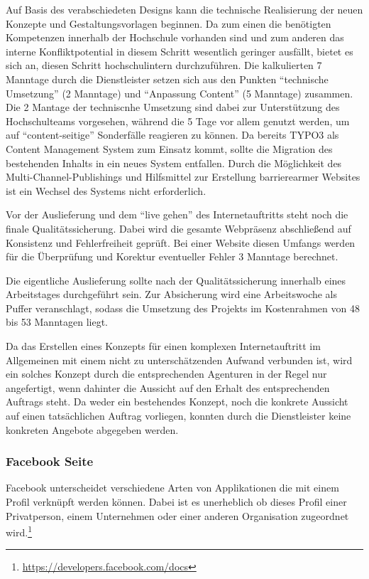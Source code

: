 Auf Basis des verabschiedeten Designs kann die technische Realisierung der neuen Konzepte und Gestaltungsvorlagen beginnen. Da zum einen die benötigten Kompetenzen innerhalb der Hochschule vorhanden sind und zum anderen das interne Konfliktpotential in diesem Schritt wesentlich geringer ausfällt, bietet es sich an, diesen Schritt hochschulintern durchzuführen. Die kalkulierten 7 Manntage durch die Dienstleister setzen sich aus den Punkten “technische Umsetzung” (2 Manntage) und “Anpassung Content” (5 Manntage) zusammen. Die 2 Mantage der techniscnhe Umsetzung sind dabei zur Unterstützung des Hochschulteams vorgesehen, während die 5 Tage vor allem genutzt werden, um auf “content-seitige” Sonderfälle reagieren zu können. Da bereits TYPO3 als Content Management System zum Einsatz kommt, sollte die Migration des bestehenden Inhalts in ein neues System entfallen. Durch die Möglichkeit des Multi-Channel-Publishings und Hilfsmittel zur Erstellung barrierearmer Websites ist ein Wechsel des Systems nicht erforderlich.

Vor der Auslieferung und dem “live gehen” des Internetauftritts steht noch die finale Qualitätssicherung. Dabei wird die gesamte Webpräsenz abschließend auf Konsistenz und Fehlerfreiheit geprüft. Bei einer Website diesen Umfangs werden für die Überprüfung und Korektur eventueller Fehler 3 Manntage berechnet.

Die eigentliche Auslieferung sollte nach der Qualitätssicherung innerhalb eines Arbeitstages durchgeführt sein. Zur Absicherung wird eine Arbeitswoche als Puffer veranschlagt, sodass die Umsetzung des Projekts im Kostenrahmen von 48 bis 53 Manntagen liegt.

Da das Erstellen eines Konzepts für einen komplexen Internetauftritt im Allgemeinen mit einem nicht zu unterschätzenden Aufwand verbunden ist, wird ein solches Konzept durch die entsprechenden Agenturen in der Regel nur angefertigt, wenn dahinter die Aussicht auf den Erhalt des entsprechenden Auftrags steht. Da weder ein bestehendes Konzept, noch die konkrete Aussicht auf einen tatsächlichen Auftrag vorliegen, konnten durch die Dienstleister keine konkreten Angebote abgegeben werden.

\subsubsection{Facebook Seite}
Facebook unterscheidet verschiedene Arten von Applikationen die mit einem Profil verknüpft werden können. Dabei ist es unerheblich ob dieses Profil einer Privatperson, einem Unternehmen oder einer anderen Organisation zugeordnet wird.\footnote{\url{https://developers.facebook.com/docs}}

